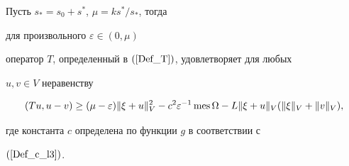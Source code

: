 




\begin{lem} \label {b21_L6}


Пусть $s_*=s_0+s^*$, $\mu=ks^*/s_*$, тогда


для произвольного $\varepsilon \in (0, \mu)$


оператор $T$, определенный в $(\ref{Def_T})$, удовлетворяет для любых


$u,v \in V$ неравенству


\begin{equation}


({T u, u -v }) \geq


(\mu -\varepsilon)\|\xi + u \|_V^2 -c^2 \varepsilon ^{-1}\mes 


\Omega-L\|\xi + u \|_V (\|\xi \|_V +\|v \|_V),


\label{b21_L5_01}


\end{equation}


где константа $c$ определена по функции $g$ в соответствии с


$(\ref{Def_c_l3})$.


\end{lem}





